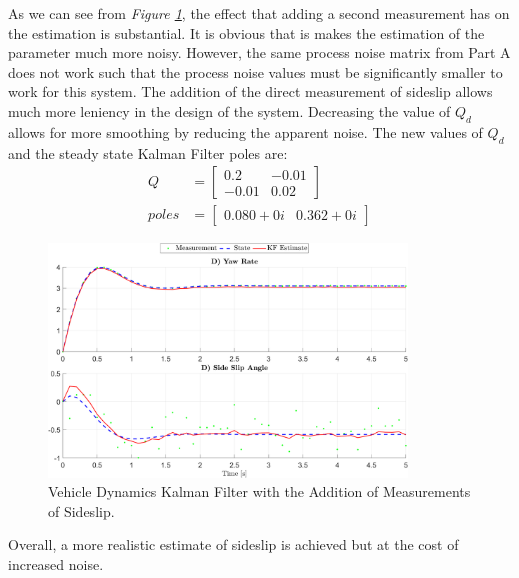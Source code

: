 \documentclass[10pt]{article}
\begin{document}
\begin{enumerate}[label=\textbf{\arabic*.}]
  As we can see from \emph{Figure \ref{f:4.3}}, the effect that adding a second 
  measurement has on the estimation is substantial. It is obvious that is makes 
  the estimation of the parameter much more noisy. However, the same process 
  noise matrix from Part A does not work such that the process noise values 
  must be significantly smaller to work for this system. The addition of the 
  direct measurement of sideslip allows much more leniency in the design of the 
  system. Decreasing the value of $Q_d$ allows for more smoothing by reducing 
  the apparent noise. The new values of $Q_d$ and the steady state Kalman Filter 
  poles are:
  \begin{equation*}
    \begin{split}
      Q &= \begin{bmatrix} 0.2 & -0.01 \\ -0.01 & 0.02 \end{bmatrix} \\
      poles &= \begin{bmatrix} 0.080+0i & 0.362+0i \end{bmatrix}
    \end{split}
  \end{equation*}
  \begin{figure}[H]
    \centering
    \includegraphics[width=0.85\textwidth]{p4_d.png}
    \caption{Vehicle Dynamics Kalman Filter with the Addition of Measurements of Sideslip.}
    \label{f:4.3}
  \end{figure}
  Overall, a more realistic estimate of sideslip is achieved but at the cost of 
  increased noise.

\end{enumerate}
\end{document}
